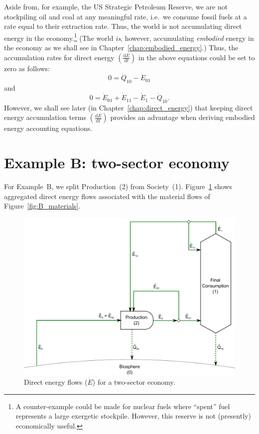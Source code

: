 Aside from, for example, the US 
Strategic Petroleum Reserve, 
we are not stockpiling oil and coal at any meaningful rate, 
i.e.\ we consume fossil fuels at a rate equal to their extraction rate. 
Thus, the world is not accumulating direct energy 
in the economy.\footnote{A counter-example could be made 
for nuclear fuels where ``spent'' fuel represents a large exergetic stockpile. 
However, this reserve is not (presently) economically useful.} 
(The world \emph{is}, however, 
accumulating \emph{embodied} energy
in the economy as we shall see 
in Chapter~\ref{chap:embodied_energy}.) 
Thus, the accumulation rates for direct energy 
$\left( \frac{\mathrm{d}E}{\mathrm{d}t} \right)$ in the above equations 
could be set to zero as follows:
%
\begin{equation} \label{eq:biosphere_direct_energy_steady_state}
	0 
	= \dot{Q}_{10} 
	- \dot{E}_{01}
\end{equation}
%
and
%
\begin{equation} \label{eq:single_sector_direct_energy_steady_state}
	0 
	= \dot{E}_{01} 
	+ \dot{E}_{11}
	- \dot{E}_{1} 
	- \dot{Q}_{10}.
\end{equation}
%
However, we shall see later (in Chapter~\ref{chap:direct_energy}) 
that keeping direct energy accumulation terms
$\left( \frac{\mathrm{d}E}{\mathrm{d}t} \right)$ 
provides an advantage when deriving embodied energy accounting equations.


\section{Example B: two-sector economy} %
\label{sec:B_energy}

For Example~B, we split Production~(2) from 
Society~(1). Figure~\ref{fig:B_energy} shows aggregated
direct energy flows associated with the material flows of Figure~\ref{fig:B_materials}.

\begin{landscape}
\begin{figure}[!ht]
\centering
\includegraphics[width=0.8\linewidth]{Part_1/Chapter_Energy/images/2_sector_direct_energy.pdf}
\caption[Direct energy flows for a two-sector economy]{Direct energy flows ($\dot{E}$) for a two-sector economy.}
\label{fig:B_energy}
\end{figure}
\end{landscape}

